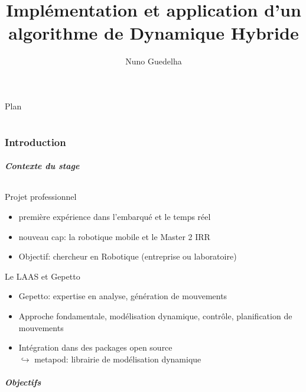 \documentclass[10pt]{beamer}
\author{Nuno Guedelha}
\title{Implémentation et application d'un algorithme de Dynamique Hybride}
\institute{LAAS-CNRS}
\date{}
\begin{document}


\begin{frame}
\titlepage
\end{frame}

\begin{frame}{Plan}
\tableofcontents[part=01]
\tableofcontents[part=02]
\end{frame}

\part{}

\section{Introduction}

\begin{frame}
  \frametitle{Contexte du stage}
  \framesubtitle{}
  \begin{block}{Projet professionnel}
  \begin{itemize}
    \item première expérience dans l'embarqué et le temps réel
    \item nouveau cap: la robotique mobile et le Master 2 IRR
    \item Objectif: chercheur en Robotique (entreprise ou laboratoire)
  \end{itemize}
  \end{block}
  \begin{block}{Le LAAS et Gepetto}
  \begin{itemize}
    \item Gepetto: expertise en analyse, génération de mouvements  
    \item Approche fondamentale, modélisation dynamique, contrôle, planification de mouvements
    \item {Intégration dans des packages open source \\
          $\hookrightarrow$ metapod: librairie de modélisation dynamique}
    \note{}
  \end{itemize}
  \end{block}
\end{frame}

\begin{frame}
  \frametitle{Objectifs}
  \framesubtitle{}
\end{frame}
\end{document}
